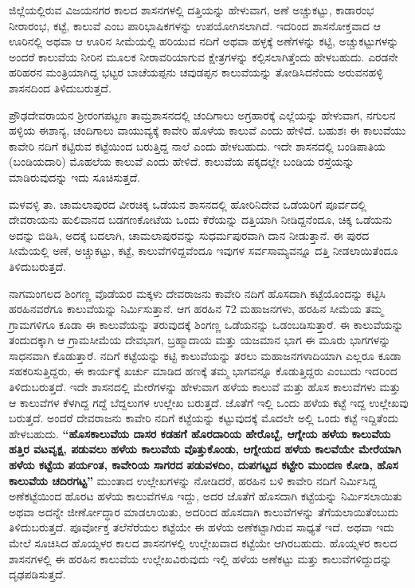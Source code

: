ಜಿಲ್ಲೆಯಲ್ಲಿರುವ ವಿಜಯನಗರ ಕಾಲದ ಶಾಸನಗಳಲ್ಲಿ ದತ್ತಿಯನ್ನು ಹೇಳುವಾಗ, ಅಣೆ ಅಚ್ಚುಕಟ್ಟು, ಕಾಡಾರಂಭ ನೀರಾರಂಭ, ಕಟ್ಟೆ, ಕಾಲುವೆ ಎಂಬ ಪಾರಿಭಾಷಿಕಗಳನ್ನು ಉಪಯೋಗಿಸಲಾಗಿದೆ. ಇದರಿಂದ ಶಾಸನೋಕ್ತವಾದ ಆ ಊರಿನಲ್ಲಿ ಅಥವಾ ಆ ಊರಿನ ಸೀಮೆಯಲ್ಲಿ ಹರಿಯುವ ನದಿಗೆ ಅಥವಾ ಹಳ್ಳಕ್ಕೆ ಅಣೆಗಳನ್ನು ಕಟ್ಟಿ, ಅಚ್ಚುಕಟ್ಟುಗಳನ್ನು ಅಂದರೆ ಕಾಲುವೆಯ ನೀರಿನ ಮೂಲಕ ನೀರಾವರಿಯಾಗುವ ಕ್ಷೇತ್ರಗಳನ್ನು ಕಲ್ಪಿಸಲಾಗಿತ್ತೆಂದು ಹೇಳಬಹುದು. ಎರಡನೇ ಹರಿಹರನ ಮಂತ್ರಿಯಾಗಿದ್ದ ಭಟ್ಟರ ಬಾಚೆಯಪ್ಪನು ಚವುಡಪ್ಪನ ಕಾಲುವೆಯನ್ನು ತೋಡಿಸಿದನೆಂದು ಅರುವನಹಳ್ಳಿ ಶಾಸನದಿಂದ ತಿಳಿದುಬರುತ್ತದೆ.

ಪ್ರೌಢದೇವರಾಯನ ಶ‍್ರೀರಂಗಪಟ್ಟಣ ತಾಮ್ರಶಾಸನದಲ್ಲಿ ಚಂದಿಗಾಲು ಅಗ್ರಹಾರಕ್ಕೆ ಎಲ್ಲೆಯನ್ನು ಹೇಳುವಾಗ, ನಗುಲನ ಹಳ್ಳಿಯ ಈಶಾನ್ಯ, ಚಂದಿಗಾಲು ವಾಯುವ್ಯಕ್ಕೆ ಕಾವೇರಿ ಹೊಳೆಯ ಕಾಲುವೆ ಎಂದು ಹೇಳಿದೆ. ಬಹುಶಃ ಈ ಕಾಲುವೆಯು ಕಾವೇರಿ ನದಿಗೆ ಕಟ್ಟಿರುವ ಕಟ್ಟೆಯಿಂದ ಬರುತ್ತಿದ್ದ ನಾಲೆ ಎಂದು ಹೇಳಬಹುದು. ಇದೇ ಶಾಸನದಲ್ಲಿ ಬಂಡಿಪಾತಿಯ (ಬಂಡಿಯದಾರಿ) ಮೊಹಲೆಯ ಕಾಲುವೆ ಎಂದು ಹೇಳಿದೆ. ಕಾಲುವೆಯ ಪಕ್ಕದಲ್ಲೇ ಬಂಡಿಯ ರಸ್ತೆಯನ್ನು ಮಾಡಿರುವುದನ್ನು ಇದು ಸೂಚಿಸುತ್ತದೆ.

ಮಳವಳ್ಳಿ ತಾ. ಚಾಮಲಾಪುರದ ವೀರಚಿಕ್ಕ ಒಡೆಯನ ಶಾಸನದಲ್ಲಿ ಹೋರಿನಿದೇವ ಒಡೆಯರಿಗೆ ಪೂರ್ವದಲ್ಲಿ ದೇವರಾಯನು ಹುಲಿವಾನದ ಬಡಗಣಕೋಟೆಯ ಒಂದು ಕೆರೆಯನ್ನು ದತ್ತಿಯಾಗಿ ನೀಡಿದ್ದನೆಂದೂ, ಚಿಕ್ಕ ಒಡೆಯನು ಅದನ್ನು ಬಿಡಿಸಿ, ಅದಕ್ಕೆ ಬದಲಾಗಿ, ಚಾಮಲಾಪುರವನ್ನು ಸುಧರ್ಮಪುರವಾಗಿ ದಾನ ನೀಡುತ್ತಾನೆ. ಈ ಪುರದ ಸೀಮೆಯಲ್ಲಿ ಅಣೆ, ಅಚ್ಚುಕಟ್ಟು, ಕಟ್ಟೆ, ಕಾಲುವೆಗಳಿದ್ದವೆಂದೂ ಇವುಗಳ ಸರ್ವಸಾಮ್ಯವನ್ನೂ ದತ್ತಿ ನೀಡಲಾಯಿತೆಂದೂ ತಿಳಿದುಬರುತ್ತದೆ.

ನಾಗಮಂಗಲದ ಶಿಂಗಣ್ಣ ವೊಡೆಯರ ಮಕ್ಕಳು ದೇವರಾಜನು ಕಾವೇರಿ ನದಿಗೆ ಹೊಸದಾಗಿ ಕಟ್ಟೆಯೊಂದನ್ನು ಕಟ್ಟಿಸಿ ಹರಹಿನವರೆಗೂ ಕಾಲುವೆಯನ್ನು ನಿರ್ಮಿಸುತ್ತಾನೆ. ಆಗ ಹರಹಿನ 72 ಮಹಾಜನಗಳು, ಹರಹಿನ ಸೀಮೆಯ ತಮ್ಮ ಗ್ರಾಮಗಳಿಗೂ ಕೂಡಾ ಈ ಕಾಲುವೆಯನ್ನು ತರುವುದಕ್ಕೆ ಶಿಂಗಣ್ಣ ಒಡೆಯನನ್ನು ಒಡಂಬಡಿಸುತ್ತಾರೆ. ಈ ಕಾಲುವೆಯನ್ನು ತಂದುದಕ್ಕಾಗಿ ಆ ಗ್ರಾಮಸೀಮೆಯ ದೇವಭಾಗ, ಬ್ರಹ್ಮಾದಾಯ ಮತ್ತು ಯಜಮಾನ ಭಾಗ ಈ ಮೂರು ಭಾಗಗಳನ್ನು ಸಾಧನವಾಗಿ ಕೊಡುತ್ತಾರೆ. ನದಿಗೆ ಕಟ್ಟೆಯನ್ನು ಕಟ್ಟಿ ಕಾಲುವೆಯನ್ನು ತರಲು ಮಹಾಜನಗಳಾದಿಯಾಗಿ ಎಲ್ಲರೂ ಕೂಡಾ ಸಹಕರಿಸುತ್ತಿದ್ದರು, ಈ ಕಾರ್ಯಕ್ಕೆ ಖರ್ಚು ಮಾಡಿದ ಹಣಕ್ಕೆ ತಮ್ಮ ಭಾಗವನ್ನೂ ಕೊಡುತ್ತಿದ್ದರು ಎಂಬುದು ಇದರಿಂದ ತಿಳಿದುಬರುತ್ತದೆ. ಇದೇ ಶಾಸನದಲ್ಲಿ ಮೇರೆಗಳನ್ನು ಹೇಳುವಾಗ ಹಳೆಯ ಕಾಲುವೆ ಮತ್ತು ಹೊಸ ಕಾಲುವೆಗಳು ಮತ್ತು ಆ ಕಾಲುವೆಗಳ ಕೆಳಗಿದ್ದ ಗದ್ದೆ ಬೆದ್ದಲುಗಳ ಉಲ್ಲೇಖ ಬರುತ್ತದೆ. ಜೊತೆಗೆ ಇಲ್ಲಿ ಒಂದು ಹಳೆಯ ಕಟ್ಟೆ ಇದ್ದ ಉಲ್ಲೇಖವು ಬರುತ್ತದೆ. ಅಂದರೆ ದೇವರಾಜನು ಕಾವೇರಿ ನದಿಗೆ ಕಟ್ಟೆಯನ್ನು ಕಟ್ಟುವುದಕ್ಕೆ ಮೊದಲೇ ಅಲ್ಲಿ ಒಂದು ಕಟ್ಟೆ ಇದ್ದಿತೆಂದು ಹೇಳಬಹುದು. \textbf{“ಹೊಸಕಾಲುವೆಯ ದಾಸರ ಕಡಹಗೆ ಹೊರದಾರಿಯ ಹೇರೊಬ್ಬೆ, ಆಗ್ನೇಯ ಹಳೆಯ ಕಾಲುವೆಯ ಹತ್ತಿರ ವಟವೃಕ್ಷ, ಪಡುವಲು ಹಳೆಯ ಕಾಲುವೆಯ ವೊತ್ತುಕೊಂಡು, ಆಗ್ನೇಯದ ಹಳೆಯ ಕಾಲವೆಯೇ ಮೇರೆಯಾಗಿ ಹಳೆಯ ಕಟ್ಟೆಯ ಪರ್ಯಂತ, ಕಾವೇರಿಯ ಸಾಗರದ ಪಡುವಳದಿಂ, ದುಪಗಟ್ಟದ ಕಟ್ಟೇರಿ ಮುಂದಣ ಕೋಡಿ, ಹೊಸ ಕಾಲುವೆಯ ಚದಿರಗಟ್ಟ”} ಮುಂತಾದ ಉಲ್ಲೇಖಗಳನ್ನು ನೋಡಿದರೆ, ಹರಹಿನ ಬಳಿ ಕಾವೇರಿ ನದಿಗೆ ನಿರ್ಮಿಸಿದ್ದ ಅಣೆಕಟ್ಟೆಯಿಂದ ಹೊರಟ ಹಳೆಯ ಕಾಲುವೆಗಳೂ ಇದ್ದು, ಅದರ ಜೊತೆಗೆ ಹೊಸದಾಗಿ ಕಟ್ಟೆಯನ್ನು ನಿರ್ಮಿಸಲಾಯಿತು ಅಥವಾ ಅದನ್ನೇ ಜೀರ್ಣೋದ್ಧಾರ ಮಾಡಲಾಯಿತು, ಅದರಿಂದ ಹೊಸದಾಗಿ ಕಾಲುವೆಗಳನ್ನು ತೆಗೆಯಲಾಯಿತೆಂಬುದು ತಿಳಿದುಬರುತ್ತದೆ. ಪೂರ್ವೋಕ್ತ ತಲೆನೆರೆಯಲ ಕಟ್ಟೆಯೇ ಈ ಹಳೆಯ ಅಣೆಕಟ್ಟಾಗಿರುವ ಸಾಧ್ಯತೆ ಇದೆ. ಅಥವಾ ಇದು ಮೇಲೆ ಸೂಚಿಸಿದ ಹೊಯ್ಸಳರ ಕಾಲದ ಶಾಸನಗಳಲ್ಲಿ ಉಲ್ಲೇಖವಾದ ಕಟ್ಟೆಯೇ ಆಗಿರಬಹುದು. ಹೊಯ್ಸಳರ ಕಾಲದ ಶಾಸನಗಳಲ್ಲಿ ಈ ಹರಹಿನ ಕಾಲುವೆಯ ಉಲ್ಲೇಖವಿರುವುದು ಇಲ್ಲಿ ಹಳೆಯ ಅಣೆಕಟ್ಟು ಮತ್ತು ಕಾಲುವೆಗಳಿದ್ದುದನ್ನು ದೃಢಪಡಿಸುತ್ತದೆ.

